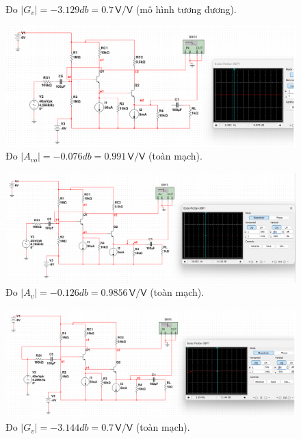 \begin{itemize}[label=-]
\begin{figure}[H]
		\caption{Đo $|G_{v}| =-3.129 db = 0.7\,\textsf{V/V}$ (mô hình tương đương).}
	\end{figure}
	\begin{figure}[H]
		\centering
		\includegraphics[width=.9\linewidth]{./my-chapters/my-images/Question7/b_avo_toanmach.png}
		\caption{Đo $|A_{vo}| =-0.076 db = 0.991\,\textsf{V/V}$ (toàn mạch).}
	\end{figure}
	\begin{figure}[H]
		\centering
		\includegraphics[width=.9\linewidth]{./my-chapters/my-images/Question7/b_av_toanmach.png}
		\caption{Đo $|A_{v}| =-0.126 db = 0.9856  \,\textsf{V/V}$ (toàn mạch).}
	\end{figure}
	\begin{figure}[H]
		\centering
		\includegraphics[width=.9\linewidth]{./my-chapters/my-images/Question7/b_gv_toanmach.png}
		\caption{Đo $|G_{v}| =-3.144 db = 0.7  \,\textsf{V/V}$ (toàn mạch).}
	\end{figure}
\end{itemize}


